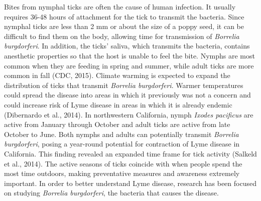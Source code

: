 \documentclass[12pt,twoside]{reedthesis}
\begin{document}
	Bites from nymphal ticks are often the cause of human infection. It usually requires 36-48 hours of attachment for the tick to transmit the bacteria. Since nymphal ticks are less than 2 mm or about the size of a poppy seed, it can be difficult to find them on the body, allowing time for transmission of \textit{Borrelia burgdorferi}. In addition, the ticks' saliva, which transmits the bacteria, contains anesthetic properties so that the host is unable to feel the bite. Nymphs are most common when they are feeding in spring and summer, while adult ticks are more common in fall (CDC, 2015). Climate warming is expected to expand the distribution of ticks that transmit \textit{Borrelia burgdorferi}. Warmer temperatures could spread the disease into areas in which it previously was not a concern and could increase risk of Lyme disease in areas in which it is already endemic (Dibernardo et al., 2014). In northwestern California, nymph \textit{Ixodes pacificus} are active from January through October and adult ticks are active from late October to June. Both nymphs and adults can potentially transmit \textit{Borrelia burgdorferi}, posing a year-round potential for contraction of Lyme disease in California. This finding revealed an expanded time frame for tick activity (Salkeld et al., 2014). The active seasons of ticks coincide with when people spend the most time outdoors, making preventative measures and awareness extremely important. In order to better understand Lyme disease, research has been focused on studying \textit{Borrelia burgdorferi}, the bacteria that causes the disease. 
	
	
	
\end{document}
